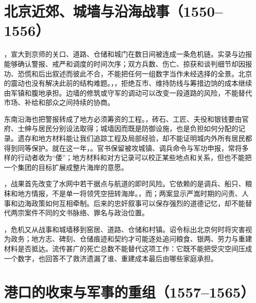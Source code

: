 \section{北京近郊、城墙与沿海战事（1550--1556）}

，宣大到京师的关口、道路、仓储和城门在数日间被连成一条危机链。实录与边报能够确认警报、戒严和调度的时间次序；双方兵数、伤亡、掠获和谈判细节却因报功、恐慌和后出叙述而彼此不合，不能把任何一组数字当作未经选择的全景。北京的震动也没有解决此前的结构难题。，，拒绝互市、维持防线与筹措边饷的成本继续由军镇和腹地承担。边墙的修筑或守军的调动可以改变一段道路的风险，不能替代市场、补给和部众之间持续的协商。

东南沿海也把警报转成了地方必须筹资的工程。，砖石、工匠、夫役和银钱要由官府、士绅与居民分别设法取得；城墙因而既是防御设施，也是负担如何分配的记录。遗存和地方材料能让我们追踪工程及局部经验，却不能证明城内外所有居民都得到同等保护。就在这一年，。官书保留被攻城镇、调兵命令与军功申报，常将多样的行动者收为“倭”；地方材料和对方记录可以校正某些地点和关系，但也不能把一个集团的目标扩展成整片海岸的意愿。

，战果首先改变了水网中若干据点与航道的即时风险。它依赖的是调兵、船只、粮秣和地方情报，不是单一将领凭空扭转海岸。，而；两案显示严嵩时期的问责、人事和边海政策如何互相牵制。后来的忠奸叙事可以保存强烈的道德记忆，却不能替代两宗案件不同的文书脉络、罪名与政治位置。

，危机又从战事和城墙移到窑居、道路、仓储和村镇。诏令标出北京何时将灾害视为政务；地方志、碑刻、仓储痕迹和契约才可能逐处追问粮食、银两、劳力与重建材料是否抵达。流传甚广的死亡总数不能替代这项工作：它既不能把受灾空间压成一个数字，也回答不了救济遗漏了谁、重建成本最后由哪些家庭承担。

\section{港口的收束与军事的重组（1557--1565）}

